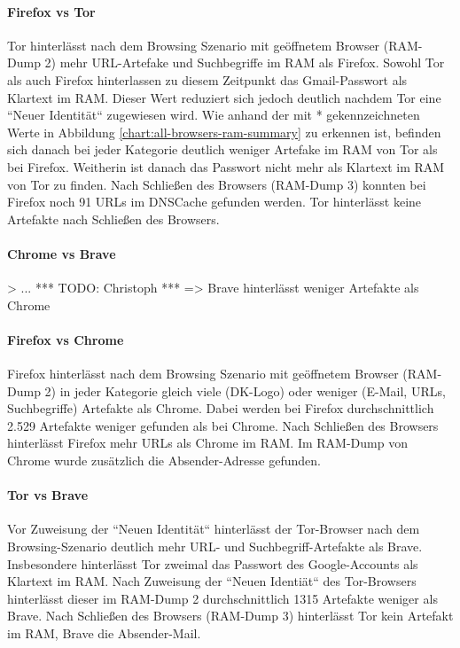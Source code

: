 \paragraph*{Firefox vs Tor}
Tor hinterlässt nach dem Browsing Szenario mit geöffnetem Browser (RAM-Dump 2) mehr URL-Artefake und Suchbegriffe im RAM als Firefox. 
Sowohl Tor als auch Firefox hinterlassen zu diesem Zeitpunkt das Gmail-Passwort als Klartext im RAM.
Dieser Wert reduziert sich jedoch deutlich nachdem Tor eine ``Neuer Identität`` zugewiesen wird. 
Wie anhand der mit * gekennzeichneten Werte in Abbildung \ref{chart:all-browsers-ram-summary} zu erkennen ist, befinden sich danach bei jeder Kategorie deutlich weniger Artefake im RAM von Tor als bei Firefox. 
Weitherin ist danach das Passwort nicht mehr als Klartext im RAM von Tor zu finden.
Nach Schließen des Browsers (RAM-Dump 3) konnten bei Firefox noch 91 URLs im DNSCache gefunden werden. 
Tor hinterlässt keine Artefakte nach Schließen des Browsers.

\paragraph*{Chrome vs Brave}
> ... *** TODO: Christoph ***
=> Brave hinterlässt weniger Artefakte als Chrome

\paragraph*{Firefox vs Chrome}
Firefox hinterlässt nach dem Browsing Szenario mit geöffnetem Browser (RAM-Dump 2) in jeder Kategorie gleich viele (DK-Logo) oder weniger (E-Mail, URLs, Suchbegriffe) Artefakte als Chrome.
Dabei werden bei Firefox durchschnittlich 2.529 Artefakte weniger gefunden als bei Chrome.
Nach Schließen des Browsers hinterlässt Firefox mehr URLs als Chrome im RAM. Im RAM-Dump von Chrome wurde zusätzlich die Absender-Adresse gefunden.

\paragraph*{Tor vs Brave}
Vor Zuweisung der ``Neuen Identität`` hinterlässt der Tor-Browser nach dem Browsing-Szenario deutlich mehr URL- und Suchbegriff-Artefakte als Brave. Insbesondere hinterlässt Tor zweimal das Passwort des Google-Accounts als Klartext im RAM.
Nach Zuweisung der ``Neuen Identiät`` des Tor-Browsers hinterlässt dieser im RAM-Dump 2 durchschnittlich 1315 Artefakte weniger als Brave.
Nach Schließen des Browsers (RAM-Dump 3) hinterlässt Tor kein Artefakt im RAM, Brave die Absender-Mail. 

